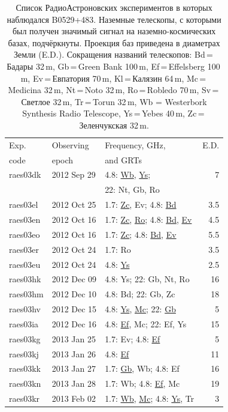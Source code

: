 \begin{table}[tbh]
\caption{Список РадиоАстроновских экспериментов в которых наблюдался B0529+483. Наземные телескопы,
с которыми был получен значимый сигнал на наземно-космических базах, подчёркнуты. Проекция баз
приведена в диаметрах Земли (E.D.). Сокращения названий телескопов: Bd\,=\,Бадары 32\,m,
Gb\,=\,Green Bank 100\,m, Ef\,=\,Effelsberg 100\,m, Ev\,=\,Евпатория 70\,m, Kl\,=\,Калязин 64\,m,
Mc\,=\,Medicina 32\,m, Nt\,=\,Noto 32\,m, Ro\,=\,Robledo 70\,m, Sv\,=\,Светлое 32\,m, Tr\,=\,Torun
32\,m, Wb = Westerbork Synthesis Radio Telescope, Ys\,=\,Yebes 40\,m, Zc\,=\,Зеленчукская 32\,m.}
\label{tab:0529_exper}
\centering
\small
\begin{SingleSpace}
\begin{tabular}{lllr}
\toprule
Exp.     & Observing   & Frequency, GHz, & E.D. \\
code     & epoch       & and GRTs        & \\
\midrule
raes03dk & 2012 Sep 29 & 4.8: \underline{Wb}, \underline{Ys}; & 7 \\
         &            &  22: Nt, Gb, Ro\\
raes03el & 2012 Oct 25 & 1.7: \underline{Zc}, Ev; 4.8: \underline{Bd} & 3.5 \\
raes03en & 2012 Oct 16 & 1.7: \underline{Zc}, \underline{Ro}; 4.8: \underline{Bd}, \underline{Ev} &
4.5 \\
raes03eo & 2012 Oct 16 & 1.7: \underline{Zc}; 4.8: \underline{Bd}, \underline{Ev} & 5.5 \\
raes03er & 2012 Oct 24 & 1.7: Ro & 3.5 \\
raes03eu & 2012 Oct 24 & 4.8: \underline{Ys} & 2.5 \\
raes03hk & 2012 Dec 09 & 4.8: Ys; 22: Gb, Nt, Ro & 16 \\
raes03hm & 2012 Dec 10 & 4.8: Bd; 22: Gb, Zc & 18 \\
raes03hv & 2012 Dec 15 & 4.8: \underline{Ys}, \underline{Mc}; 22: \underline{Gb} & 5 \\
raes03ia & 2012 Dec 16 & 4.8: \underline{Ef}, Mc; 22: Ef, Ys & 15 \\
raes03kg & 2013 Jan 25 & 1.7: Ev; 4.8: \underline{Ef} & 5 \\
raes03kj & 2013 Jan 26 & 4.8: \underline{Ef} & 11 \\
raes03kk & 2013 Jan 27 & 1.7: \underline{Gb}, Wb; 4.8: Ef & 16 \\
raes03kn & 2013 Jan 28 & 1.7: Wb; 4.8: \underline{Ef}, Mc & 19 \\
raes03kr & 2013 Feb 02 & 1.7: \underline{Wb}, \underline{Mc}; 4.8: \underline{Ys}, Tr & 3 \\

\end{tabular}
\end{SingleSpace}
\end{table}

